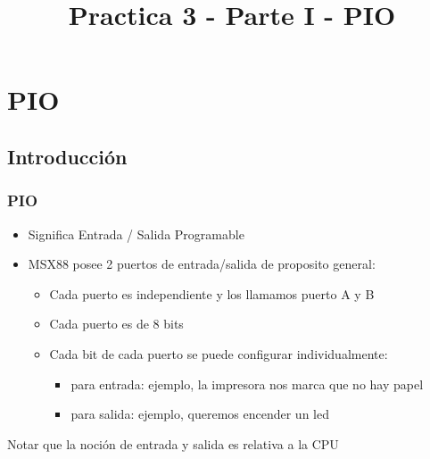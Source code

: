 \documentclass{beamer}
\title{Practica 3 - Parte I - PIO}
\begin{document}
\begin{frame}
\titlepage
\end{frame}

\section{PIO}
\subsection{Introducción}
\begin{frame}
\frametitle{PIO}
\begin{itemize}
 \item Significa Entrada / Salida Programable
 \item MSX88 posee 2 puertos de entrada/salida de proposito general:
 \begin{itemize}
   \item Cada puerto es independiente y los llamamos puerto A y B
   \item Cada puerto es de 8 bits 
   \item Cada bit de cada puerto se puede configurar individualmente:
   \begin{itemize}
     \item para entrada: ejemplo, la impresora nos marca que no hay papel
     \item para salida: ejemplo, queremos encender un led
   \end{itemize}
 \end{itemize}
\end{itemize}
\begin{block}{}
Notar que la noción de entrada y salida es relativa a la CPU
\end{block}
\end{frame}
\end{document}
